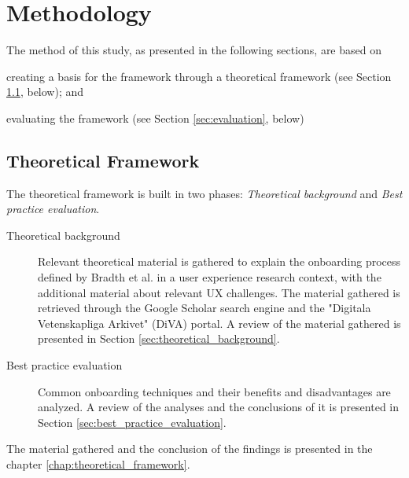 \chapter{Methodology}
\label{chap:methodology}

The method of this study, as presented in the following sections, are based on \begin{enumerate*}[label=(\(\arabic*\))]
  \item creating a basis for the framework through a theoretical framework (see Section \ref{sec:theoretical_framework}, below); and
  \item evaluating the framework (see Section \ref{sec:evaluation}, below)
\end{enumerate*}

\section{Theoretical Framework}
\label{sec:theoretical_framework}
The theoretical framework is built in two phases: \textit{Theoretical background} and \textit{Best practice evaluation}.

\begin{description}
  \item [Theoretical background] Relevant theoretical material is gathered to explain the onboarding process defined by Bradth et al. \cite{Bradt2009} in a user experience research context, with the additional material about relevant UX challenges. The material gathered is retrieved through the Google Scholar search engine and the "Digitala Vetenskapliga Arkivet" (DiVA) portal. A review of the material gathered is presented in Section \ref{sec:theoretical_background}.
  \item [Best practice evaluation] Common onboarding techniques and their benefits and disadvantages are analyzed. A review of the analyses and the conclusions of it is presented in Section \ref{sec:best_practice_evaluation}.
\end{description}

The material gathered and the conclusion of the findings is presented in the chapter \ref{chap:theoretical_framework}.

